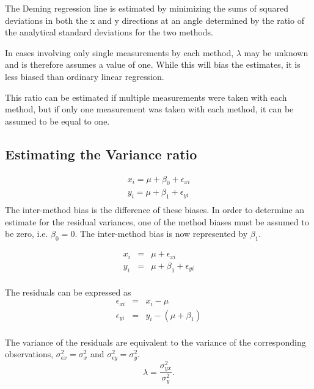 \documentclass[12pt, a4paper]{report}
\theoremstyle{plain}
\theoremstyle{definition}
\theoremstyle{remark}
\begin{document}
	


The Deming regression line is estimated by minimizing the sums of squared deviations in both the x and y directions at an angle determined by the ratio of the analytical standard deviations for the two methods.

In cases involving only single measurements by each method, $\lambda$ may be unknown and is therefore assumes a value of one. While this will bias the estimates, it is less biased than ordinary linear regression.

This ratio can be estimated if multiple measurements were taken with each method, but if only one measurement was taken with each method, it can be assumed to be equal to one.










\subsection{Estimating the Variance ratio}


\begin{eqnarray*}
	x_{i} = \mu +  \beta_{0} + \epsilon_{xi}\\
	y_{i} = \mu +  \beta_{1} + \epsilon_{yi}\\
\end{eqnarray*}
The inter-method bias is the difference of these biases. In order to determine an estimate for the residual variances, one of the method biases must be assumed to be zero, i.e. $\beta_{0} = 0$. The inter-method bias is now represented by $\beta_{1}$.

\begin{eqnarray*}
	x_{i} &=& \mu + \epsilon_{xi}\\
	y_{i} &=& \mu +  \beta_{1} + \epsilon_{yi}\\
\end{eqnarray*}

The residuals can be expressed as
\begin{eqnarray*}
	\epsilon_{xi} &=& x_{i} - \mu  \\
	\epsilon_{yi} &=& y_{i} - (\mu + \beta_{1}) \\
\end{eqnarray*}

The variance of the residuals are equivalent to the variance of the corresponding observations, $\sigma^{2}_{\epsilon x} =
\sigma^{2}_{x}$ and $\sigma^{2}_{\epsilon y} = \sigma^{2}_{y}$.
\begin{equation}
\lambda = \frac{\sigma^{2}_{yx}}{\sigma^{2}_{y}}.
\end{equation}
\end{document}
